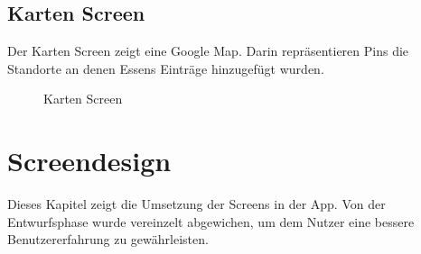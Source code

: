 \documentclass[
    DIV12,
    cleardouble=plain,
    headings=normal,
    pdftex,
    headexclude,footexclude,
    final
]{scrreprt}
\begin{document}
\section{Karten Screen}
Der Karten Screen zeigt eine Google Map. Darin repräsentieren Pins die Standorte an denen Essens Einträge hinzugefügt wurden.
\begin{figure}[H]
	\centering
	\caption{Karten Screen}
	\label{map}
\end{figure}




\newpage



\chapter{Screendesign}
Dieses Kapitel zeigt die Umsetzung der Screens in der App. Von der Entwurfsphase wurde vereinzelt abgewichen, um dem Nutzer eine bessere Benutzererfahrung zu gewährleisten.
\end{document}
